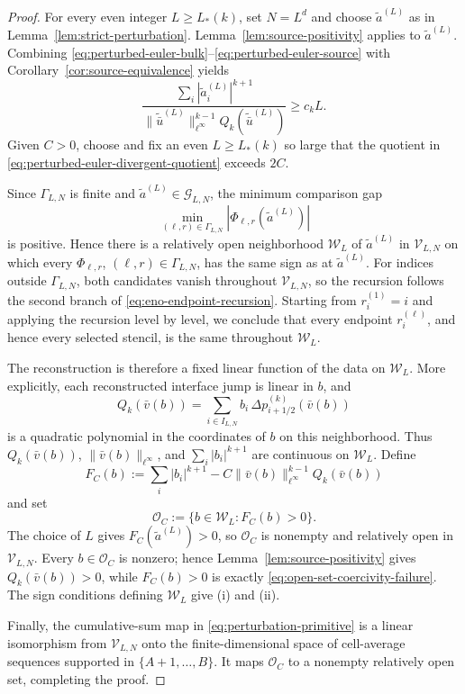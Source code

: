 \documentclass[11pt]{amsart}
\theoremstyle{plain}
\theoremstyle{definition}
\theoremstyle{remark}
\numberwithin{equation}{section}
\theoremstyle{plain}
\begin{document}
\begin{proof}
	For every even integer $L\ge L_*(k)$, set $N=L^d$ and choose
	$\widetilde a^{(L)}$ as in Lemma~\ref{lem:strict-perturbation}.
	Lemma~\ref{lem:source-positivity} applies to
	$\widetilde a^{(L)}$.  Combining
	\eqref{eq:perturbed-euler-bulk}--\eqref{eq:perturbed-euler-source} with
	Corollary~\ref{cor:source-equivalence} yields
	\begin{equation}\label{eq:perturbed-euler-divergent-quotient}
		\frac{\displaystyle\sum_i|\widetilde a_i^{(L)}|^{k+1}}
		{\displaystyle
			\|\widetilde{\bar u}^{(L)}\|_{\ell^\infty}^{k-1}
			Q_k(\widetilde{\bar u}^{(L)})}
		\ge c_kL.
	\end{equation}
	Given $C>0$, choose and fix an even $L\ge L_*(k)$ so large that the
	quotient in \eqref{eq:perturbed-euler-divergent-quotient} exceeds $2C$.

	Since $\Gamma_{L,N}$ is finite and
	$\widetilde a^{(L)}\in\mathcal G_{L,N}$, the minimum comparison gap
	\[
		\min_{(\ell,r)\in\Gamma_{L,N}}
		|\Phi_{\ell,r}(\widetilde a^{(L)})|
	\]
	is positive.  Hence there is a relatively open neighborhood
	$\mathcal W_L$ of $\widetilde a^{(L)}$ in $\mathcal V_{L,N}$ on which every
	$\Phi_{\ell,r}$, $(\ell,r)\in\Gamma_{L,N}$, has the same sign as at
	$\widetilde a^{(L)}$.  For indices outside $\Gamma_{L,N}$, both candidates
	vanish throughout $\mathcal V_{L,N}$, so the recursion follows the second
	branch of \eqref{eq:eno-endpoint-recursion}.  Starting from
	$r_i^{(1)}=i$ and applying the recursion level by level, we conclude that
	every endpoint $r_i^{(\ell)}$, and hence every selected stencil, is the same
	throughout $\mathcal W_L$.

	The reconstruction is therefore a fixed linear function of the data on
	$\mathcal W_L$.  More explicitly, each reconstructed interface jump is
	linear in $b$, and
	\[
		Q_k(\bar v(b))
		=\sum_{i\in I_{L,N}}b_i\,
		\Delta p_{i+1/2}^{(k)}(\bar v(b))
	\]
	is a quadratic polynomial in the coordinates of $b$ on this neighborhood.
	Thus $Q_k(\bar v(b))$, $\|\bar v(b)\|_{\ell^\infty}$, and
	$\sum_i|b_i|^{k+1}$ are continuous on $\mathcal W_L$.  Define
	\[
		F_C(b):=\sum_i|b_i|^{k+1}
		-C\|\bar v(b)\|_{\ell^\infty}^{k-1}Q_k(\bar v(b))
	\]
	and set
	\[
		\mathcal O_C:=\{b\in\mathcal W_L:F_C(b)>0\}.
	\]
	The choice of $L$ gives $F_C(\widetilde a^{(L)})>0$, so
	$\mathcal O_C$ is nonempty and relatively open in $\mathcal V_{L,N}$.
	Every $b\in\mathcal O_C$ is nonzero; hence
	Lemma~\ref{lem:source-positivity} gives $Q_k(\bar v(b))>0$, while
	$F_C(b)>0$ is exactly \eqref{eq:open-set-coercivity-failure}.  The sign
	conditions defining $\mathcal W_L$ give (i) and (ii).

	Finally, the cumulative-sum map in \eqref{eq:perturbation-primitive} is a
	linear isomorphism from $\mathcal V_{L,N}$ onto the finite-dimensional
	space of cell-average sequences supported in $\{A+1,\ldots,B\}$.  It maps
	$\mathcal O_C$ to a nonempty relatively open set, completing the proof.
\end{proof}
\end{document}
